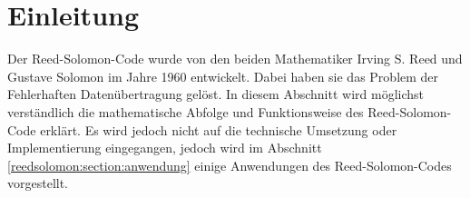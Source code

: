 %
%
%
\section{Einleitung
\label{reedsolomon:section:einleitung}}
Der Reed-Solomon-Code wurde von den beiden Mathematiker Irving S. Reed und Gustave Solomon im Jahre 1960 entwickelt.
Dabei haben sie das Problem der Fehlerhaften Datenübertragung gelöst.
In diesem Abschnitt wird möglichst verständlich die mathematische Abfolge und  
Funktionsweise des Reed-Solomon-Code erklärt.
Es wird jedoch nicht auf die technische Umsetzung oder Implementierung eingegangen, jedoch wird im Abschnitt \ref{reedsolomon:section:anwendung} einige Anwendungen des Reed-Solomon-Codes vorgestellt.




